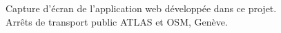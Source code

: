 \thispagestyle{empty}
\vspace*{500pt} %
\begin{flushleft}
Capture d'écran de l'application web développée dans ce projet.\\
Arrêts de transport public ATLAS et OSM, Genève.
\end{flushleft}